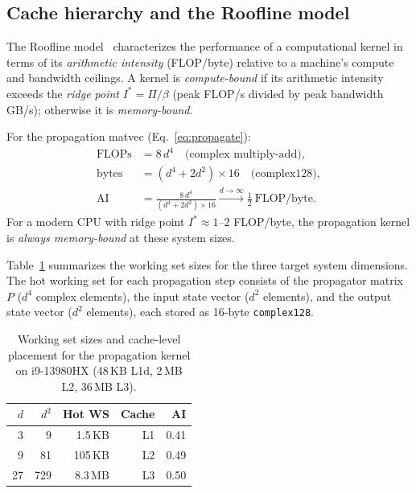\documentclass[a4paper,noarxiv]{quantumarticle}
\begin{document}
\subsection{Cache hierarchy and the Roofline model}
\label{sec:roofline_bg}

The Roofline model~\cite{Williams2009} characterizes the performance of a
computational kernel in terms of its \emph{arithmetic intensity}
(FLOP/byte) relative to a machine's compute and bandwidth ceilings.
A kernel is \emph{compute-bound} if its arithmetic intensity exceeds the
\emph{ridge point} $I^* = \Pi / \beta$ (peak FLOP/s divided by peak
bandwidth GB/s); otherwise it is \emph{memory-bound}.

For the propagation matvec (Eq.~\eqref{eq:propagate}):
\begin{align}
  \text{FLOPs} &= 8\,d^4 \quad \text{(complex multiply-add)}, \\
  \text{bytes} &= (d^4 + 2d^2) \times 16 \quad \text{(complex128)}, \\
  \text{AI}    &= \frac{8\,d^4}{(d^4 + 2d^2) \times 16}
                \xrightarrow{d \to \infty} \frac{1}{2}\ \text{FLOP/byte}.
\end{align}
%
For a modern CPU with ridge point $I^* \approx 1$--$2$ FLOP/byte, the
propagation kernel is \emph{always memory-bound} at these system sizes.

Table~\ref{tab:working_set} summarizes the working set sizes for the three
target system dimensions. The hot working set for each propagation step
consists of the propagator matrix $P$ ($d^4$ complex elements), the input
state vector ($d^2$ elements), and the output state vector ($d^2$ elements),
each stored as 16-byte \texttt{complex128}.

\begin{table}[h]
  \centering
  \caption{Working set sizes and cache-level placement for the propagation
           kernel on i9-13980HX (48\,KB L1d, 2\,MB L2, 36\,MB L3).}
  \label{tab:working_set}
  \begin{tabular}{@{}rrrrr@{}}
    \toprule
    $d$ & $d^2$ & Hot WS & Cache & AI \\
    \midrule
    3  & 9   & 1.5\,KB   & L1  & 0.41 \\
    9  & 81  & 105\,KB   & L2  & 0.49 \\
    27 & 729 & 8.3\,MB   & L3  & 0.50 \\
    \bottomrule
  \end{tabular}
\end{table}
\end{document}

